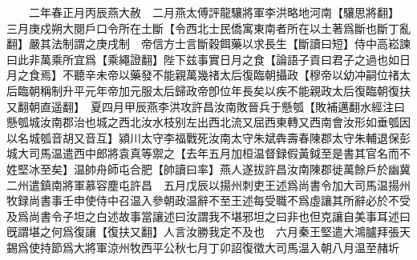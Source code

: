 　　二年春正月丙辰燕大赦　二月燕太傅評龍驤將軍李洪略地河南【驤思將翻】　三月庚戍朔大閱戶口令所在土斷【令西北士民僑寓東南者所在以土著爲斷也斷丁亂翻】嚴其法制謂之庚戌制　帝信方士言斷穀餌藥以求長生【斷讀曰短】侍中高崧諫曰此非萬乘所宜爲【乘繩證翻】陛下兹事實日月之食【論語子貢曰君子之過也如日月之食焉】不聽辛未帝以藥發不能親萬幾禇太后復臨朝攝政【穆帝以幼冲嗣位禇太后臨朝稱制升平元年帝加元服太后歸政帝卽位年長矣以疾不能親政太后復臨朝復扶又翻朝直遥翻】　夏四月甲辰燕李洪攻許昌汝南敗晉兵于懸瓠【敗補邁翻水經注曰懸瓠城汝南郡治也城之西北汝水枝别左出西北流又屈西東轉又西南會汝形如垂瓠因以名城瓠音胡又音互】潁川太守李福戰死汝南太守朱斌犇壽春陳郡太守朱輔退保彭城大司馬温遣西中郎將袁真等禦之【去年五月加桓温督録假黃鉞至是書其官名而不姓堅冰至矣】温帥舟師屯合肥【帥讀曰率】燕人遂拔許昌汝南陳郡徙萬餘戶於幽冀二州遣鎮南將軍慕容塵屯許昌　五月戊辰以揚州刺吏王述爲尚書令加大司馬温揚州牧録尚書事壬申使侍中召温入參朝政温辭不至王述每受職不爲虛讓其所辭必於不受及爲尚書令子坦之白述故事當讓述曰汝謂我不堪邪坦之曰非也但克讓自美事耳述曰旣謂堪之何爲復讓【復扶又翻】人言汝勝我定不及也　六月秦王堅遣大鴻臚拜張天錫爲使持節爲大將軍涼州牧西平公秋七月丁卯詔復徵大司馬温入朝八月温至赭圻


